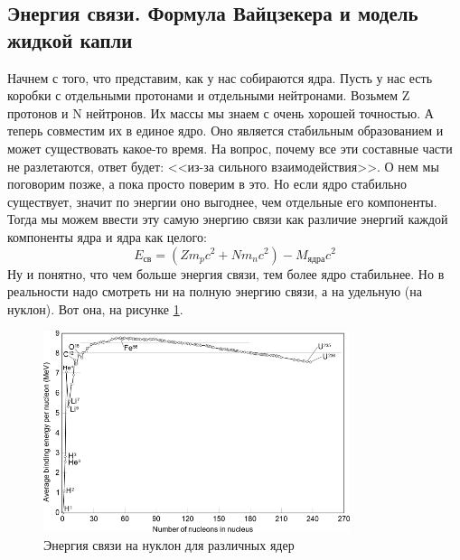\documentclass[12pt]{article}
\begin{document}
\subsection{Энергия связи. Формула Вайцзекера и модель жидкой капли}
Начнем с того, что представим, как у нас собираются ядра. Пусть у нас есть коробки с отдельными протонами и отдельными нейтронами. Возьмем Z протонов и N нейтронов. Их массы мы знаем с очень хорошей точностью. А теперь совместим их в единое ядро. Оно является стабильным образованием и может существовать какое-то время. На вопрос, почему все эти составные части не разлетаются, ответ будет: <<из-за сильного взаимодействия>>. О нем мы поговорим позже, а пока просто поверим в это. Но если ядро стабильно существует, значит по энергии оно выгоднее, чем отдельные его компоненты. Тогда мы можем ввести эту самую энергию связи как различие энергий каждой компоненты ядра и ядра как целого:
\begin{equation}
    E_{\text{св}} = (Z m_pc^2 + N m_nc^2) - M_{\text{ядра}}c^2
\end{equation}
Ну и понятно, что чем больше энергия связи, тем более ядро стабильнее. Но в реальности надо смотреть ни на полную энергию связи, а на удельную (на нуклон). Вот она, на рисунке \ref{fig:sem_09_link_energy}.
\begin{figure}[h]
    \centering
    \includegraphics[width=0.8\textwidth,height=\textheight,keepaspectratio]{Seminar_09/pics/pic_binding_energy.png}
    \caption{Энергия связи на нуклон для различных ядер}
    \label{fig:sem_09_link_energy}
\end{figure}
\end{document}
